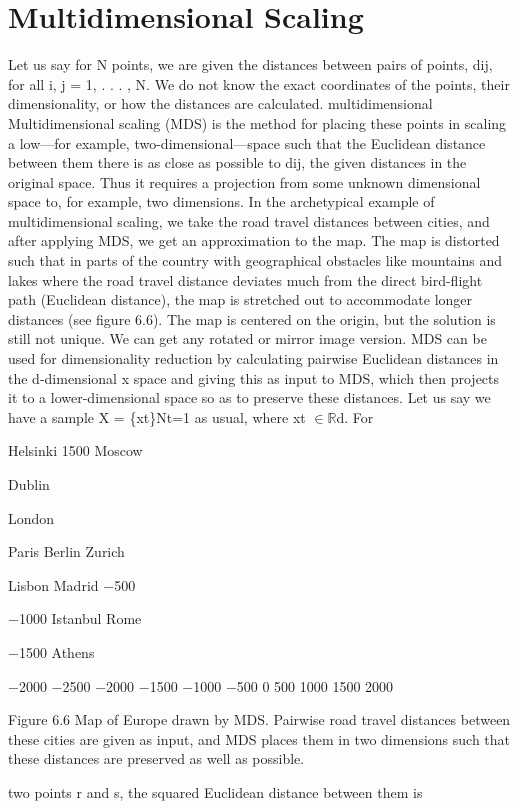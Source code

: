 \section{Multidimensional Scaling}

Let us say for N points, we are given the distances between pairs of points, dij, for all i, j = 1, . . . , N. We do not know the exact coordinates of the points, their dimensionality, or how the distances are calculated. multidimensional Multidimensional scaling (MDS) is the method for placing these points in scaling a low---for example, two-dimensional---space such that the Euclidean distance between them there is as close as possible to dij, the given distances in the original space. Thus it requires a projection from some unknown dimensional space to, for example, two dimensions. In the archetypical example of multidimensional scaling, we take the road travel distances between cities, and after applying MDS, we get an approximation to the map. The map is distorted such that in parts of the country with geographical obstacles like mountains and lakes where the road travel distance deviates much from the direct bird-flight path (Euclidean distance), the map is stretched out to accommodate longer distances (see figure 6.6). The map is centered on the origin, but the solution is still not unique. We can get any rotated or mirror image version. MDS can be used for dimensionality reduction by calculating pairwise Euclidean distances in the d-dimensional x space and giving this as input to MDS, which then projects it to a lower-dimensional space so as to preserve these distances. Let us say we have a sample X = \{xt\}Nt=1 as usual, where xt $\in$$\mathbb{R}$d. For

Helsinki 1500 Moscow

Dublin

London

Paris Berlin Zurich

Lisbon Madrid $-$500

$-$1000 Istanbul Rome

$-$1500 Athens

$-$2000 $-$2500 $-$2000 $-$1500 $-$1000 $-$500 0 500 1000 1500 2000

Figure 6.6 Map of Europe drawn by MDS. Pairwise road travel distances between these cities are given as input, and MDS places them in two dimensions such that these distances are preserved as well as possible.

two points r and s, the squared Euclidean distance between them is

